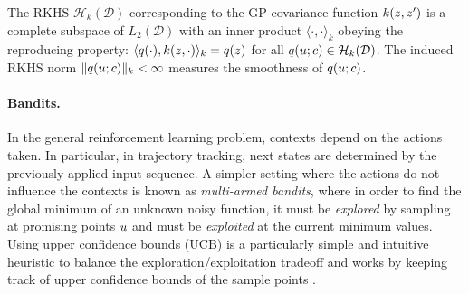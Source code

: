 
The RKHS $\mathcal{H}_{k}(\mathcal{D})$ corresponding to the GP covariance function $k(z,z')$ is a complete subspace of $L_{2}(\mathcal{D})$ with an inner product $\langle \cdot,\cdot \rangle_{k}$ obeying the reproducing property: $\langle q(\cdot), k(z,\cdot) \rangle_{k} = q(z)$ for all $q(u;c) \in \mathcal{H}_{k}(\mathcal{D})$. The induced RKHS norm $\|q(u;c)\|_{k} < \infty$ measures the smoothness of $q(u;c)$. %

\paragraph*{Bandits.} In the general reinforcement learning problem, contexts depend on the actions taken. In particular, in trajectory tracking, next states are determined by the previously applied input sequence. A simpler setting where the actions do not influence the contexts is known as \emph{multi-armed bandits}, where in order to find the global minimum of an unknown noisy function, it must be \textit{explored} by sampling at promising points $u$ and must be \textit{exploited} at the current minimum values. Using upper confidence bounds (UCB) is a particularly simple and intuitive heuristic to balance the exploration/exploitation tradeoff and works by keeping track of upper confidence bounds of the sample points \cite{Srinivas09}. 

